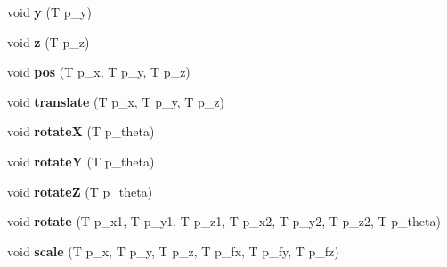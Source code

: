 \begin{DoxyCompactItemize}
\item 
\hypertarget{classpolygons_1_1vertex_aaee907890acfc192b3bdccdf1f2a49fd}{void {\bfseries y} (T p\-\_\-y)}\label{classpolygons_1_1vertex_aaee907890acfc192b3bdccdf1f2a49fd}

\item 
\hypertarget{classpolygons_1_1vertex_a7f5cdb953ab958f8205d0613198927d5}{void {\bfseries z} (T p\-\_\-z)}\label{classpolygons_1_1vertex_a7f5cdb953ab958f8205d0613198927d5}

\item 
\hypertarget{classpolygons_1_1vertex_a580ba47cb1310c14fb627cfe586caa1f}{void {\bfseries pos} (T p\-\_\-x, T p\-\_\-y, T p\-\_\-z)}\label{classpolygons_1_1vertex_a580ba47cb1310c14fb627cfe586caa1f}

\item 
\hypertarget{classpolygons_1_1vertex_a734a367601a84d9328be94d0d4a3b74a}{void {\bfseries translate} (T p\-\_\-x, T p\-\_\-y, T p\-\_\-z)}\label{classpolygons_1_1vertex_a734a367601a84d9328be94d0d4a3b74a}

\item 
\hypertarget{classpolygons_1_1vertex_a181e0714703ed81ed70cdb512f55dfaf}{void {\bfseries rotate\-X} (T p\-\_\-theta)}\label{classpolygons_1_1vertex_a181e0714703ed81ed70cdb512f55dfaf}

\item 
\hypertarget{classpolygons_1_1vertex_ab0b42c9271695811f90002290837c528}{void {\bfseries rotate\-Y} (T p\-\_\-theta)}\label{classpolygons_1_1vertex_ab0b42c9271695811f90002290837c528}

\item 
\hypertarget{classpolygons_1_1vertex_afd0e8a9c607babecc23ec304cfb300bf}{void {\bfseries rotate\-Z} (T p\-\_\-theta)}\label{classpolygons_1_1vertex_afd0e8a9c607babecc23ec304cfb300bf}

\item 
\hypertarget{classpolygons_1_1vertex_a61d7eec7a044510d32adf5af34a3fc60}{void {\bfseries rotate} (T p\-\_\-x1, T p\-\_\-y1, T p\-\_\-z1, T p\-\_\-x2, T p\-\_\-y2, T p\-\_\-z2, T p\-\_\-theta)}\label{classpolygons_1_1vertex_a61d7eec7a044510d32adf5af34a3fc60}

\item 
\hypertarget{classpolygons_1_1vertex_a61930a82c90b43714d413a5af1f1c504}{void {\bfseries scale} (T p\-\_\-x, T p\-\_\-y, T p\-\_\-z, T p\-\_\-fx, T p\-\_\-fy, T p\-\_\-fz)}\label{classpolygons_1_1vertex_a61930a82c90b43714d413a5af1f1c504}

\end{DoxyCompactItemize}
